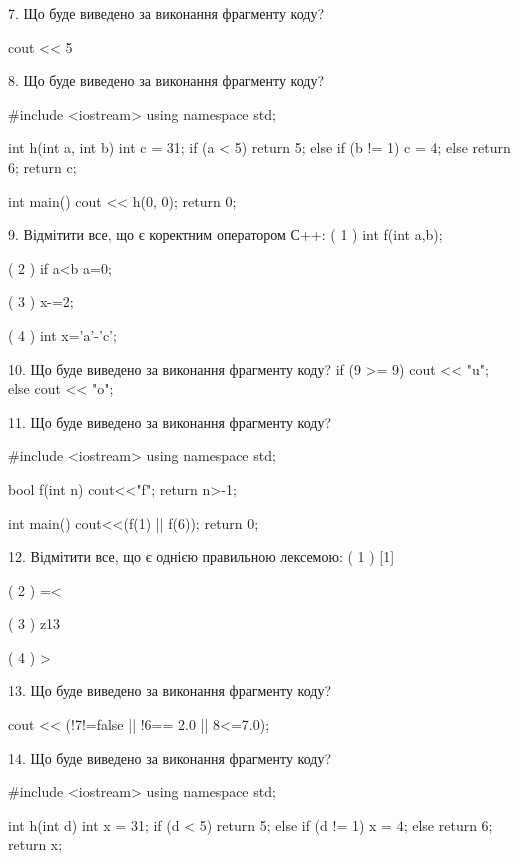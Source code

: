 \documentclass[11pt, ukrainian]{article}
\begin{document}
\begin{large}

7. Що буде виведено за виконання фрагменту коду?

cout << 5 %


8. Що буде виведено за виконання фрагменту коду?

#include <iostream>
using namespace std;

int h(int a, int b){
    int c = 31;
    if (a < 5)
        return 5;
    else if (b != 1)
         c = 4;
    else 
        return 6;
    return c;
}

int main(){
    cout << h(0, 0);
    return 0;
}


9. Відмітити все, що є коректним оператором С++:
( 1 ) int f(int a,b);

( 2 ) if a<b a=0;

( 3 ) x-=2;

( 4 ) int x='a'-'c';


10. Що буде виведено за виконання фрагменту коду?
if (9 >= 9)
    cout << "u";
else
    cout << "o";



11. Що буде виведено за виконання фрагменту коду?

#include <iostream>
using namespace std;

bool f(int n){
    cout<<"f";
    return n>-1;
}

int main(){
    cout<<(f(1) || f(6));
    return 0;
}


12. Відмітити все, що є однією правильною лексемою:
( 1 ) [1]

( 2 ) =<

( 3 ) z13

( 4 ) >


13. Що буде виведено за виконання фрагменту коду?

cout << (!7!=false || !6== 2.0 || 8<=7.0);


14. Що буде виведено за виконання фрагменту коду?

#include <iostream>
using namespace std;

int h(int d){
    int x = 31;
    if (d < 5) 
        return 5;
    else if (d != 1)
         x = 4;
    else
         return 6;
    return x;
}


\end{large}
\end{document}
